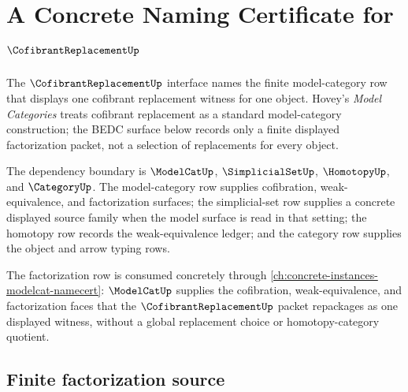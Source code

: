 \chapter{A Concrete Naming Certificate for $\CofibrantReplacementUp$}
\label{ch:concrete-instances-cofibrantreplacement-namecert}

The $\CofibrantReplacementUp$ interface names the finite model-category row that displays one cofibrant replacement witness for one object. Hovey's \emph{Model Categories} treats cofibrant replacement as a standard model-category construction; the BEDC surface below records only a finite displayed factorization packet, not a selection of replacements for every object.

The dependency boundary is $\ModelCatUp$, $\SimplicialSetUp$, $\HomotopyUp$, and $\CategoryUp$. The model-category row supplies cofibration, weak-equivalence, and factorization surfaces; the simplicial-set row supplies a concrete displayed source family when the model surface is read in that setting; the homotopy row records the weak-equivalence ledger; and the category row supplies the object and arrow typing rows.

The factorization row is consumed concretely through \autoref{ch:concrete-instances-modelcat-namecert}: $\ModelCatUp$ supplies the cofibration, weak-equivalence, and factorization faces that the $\CofibrantReplacementUp$ packet repackages as one displayed witness, without a global replacement choice or homotopy-category quotient.

\section{Finite factorization source}
\label{sec:cofibrantreplacement-factorization-source}

